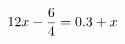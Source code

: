 \documentclass[preview]{standalone}
\begin{document}
\begin{align*}
\special{dvisvgm:raw <g id='unique000'>}12x - \frac{6}{4} = 0.3 + x\special{dvisvgm:raw </g>}
\end{align*}
\end{document}
